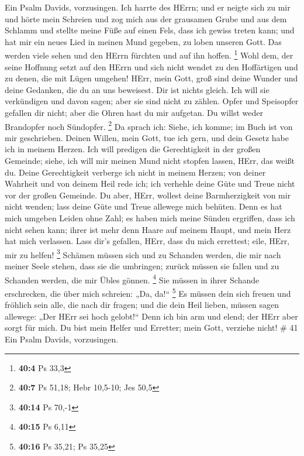  Ein Psalm Davids, vorzusingen.  Ich harrte des
HErrn; und er neigte sich zu mir und hörte mein Schreien 
und zog mich aus der grausamen Grube und aus dem Schlamm und stellte
meine Füße auf einen Fels, dass ich gewiss treten kann;  und
hat mir ein neues Lied in meinen Mund gegeben, zu loben unseren Gott.
Das werden viele sehen und den HErrn fürchten und auf ihn hoffen.
\footnote{\textbf{40:4} Ps 33,3}  Wohl dem, der seine
Hoffnung setzt auf den HErrn und sich nicht wendet zu den Hoffärtigen
und zu denen, die mit Lügen umgehen!  HErr, mein Gott, groß
sind deine Wunder und deine Gedanken, die du an uns beweisest. Dir ist
nichts gleich. Ich will sie verkündigen und davon sagen; aber sie sind
nicht zu zählen.  Opfer und Speisopfer gefallen dir nicht;
aber die Ohren hast du mir aufgetan. Du willst weder Brandopfer noch
Sündopfer. \footnote{\textbf{40:7} Ps 51,18; Hebr 10,5-10; Jes 50,5}
 Da sprach ich: Siehe, ich komme; im Buch ist von mir
geschrieben.  Deinen Willen, mein Gott, tue ich gern, und
dein Gesetz habe ich in meinem Herzen.  Ich will predigen
die Gerechtigkeit in der großen Gemeinde; siehe, ich will mir meinen
Mund nicht stopfen lassen, HErr, das weißt du.  Deine
Gerechtigkeit verberge ich nicht in meinem Herzen; von deiner Wahrheit
und von deinem Heil rede ich; ich verhehle deine Güte und Treue nicht
vor der großen Gemeinde.  Du aber, HErr, wollest deine
Barmherzigkeit von mir nicht wenden; lass deine Güte und Treue allewege
mich behüten.  Denn es hat mich umgeben Leiden ohne Zahl;
es haben mich meine Sünden ergriffen, dass ich nicht sehen kann; ihrer
ist mehr denn Haare auf meinem Haupt, und mein Herz hat mich verlassen.
 Lass dir's gefallen, HErr, dass du mich errettest; eile,
HErr, mir zu helfen! \footnote{\textbf{40:14} Ps 70,-1} 
Schämen müssen sich und zu Schanden werden, die mir nach meiner Seele
stehen, dass sie die umbringen; zurück müssen sie fallen und zu Schanden
werden, die mir Übles gönnen. \footnote{\textbf{40:15} Ps 6,11}
 Sie müssen in ihrer Schande erschrecken, die über mich
schreien: „Da, da!{}`` \footnote{\textbf{40:16} Ps 35,21; Ps 35,25}
 Es müssen dein sich freuen und fröhlich sein alle, die
nach dir fragen; und die dein Heil lieben, müssen sagen allewege: „Der
HErr sei hoch gelobt!{}``  Denn ich bin arm und elend; der
HErr aber sorgt für mich. Du bist mein Helfer und Erretter; mein Gott,
verziehe nicht! \# 41  Ein Psalm Davids, vorzusingen.
